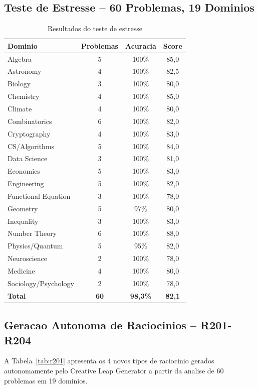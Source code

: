 \documentclass[5p]{elsarticle}
\begin{document}
\subsection{Teste de Estresse -- 60 Problemas, 19 Dominios}

\begin{table}[H]
 \centering
 \caption{Resultados do teste de estresse}
 \label{tab:stress}
 \footnotesize
 \begin{tabular}{lccc}
 \toprule
 \textbf{Dominio} & \textbf{Problemas} & \textbf{Acuracia} & \textbf{Score}\\
 \midrule
 Algebra & 5 & 100\% & 85,0\\
 Astronomy & 4 & 100\% & 82,5\\
 Biology & 3 & 100\% & 80,0\\
 Chemistry & 4 & 100\% & 85,0\\
 Climate & 4 & 100\% & 80,0\\
 Combinatorics & 6 & 100\% & 82,0\\
 Cryptography & 4 & 100\% & 83,0\\
 CS/Algorithms & 5 & 100\% & 84,0\\
 Data Science & 3 & 100\% & 81,0\\
 Economics & 5 & 100\% & 83,0\\
 Engineering & 5 & 100\% & 82,0\\
 Functional Equation & 3 & 100\% & 78,0\\
 Geometry & 5 & 97\% & 80,0\\
 Inequality & 3 & 100\% & 83,0\\
 Number Theory & 6 & 100\% & 88,0\\
 \rowcolor{greenbg} Physics/Quantum & 5 & 95\% & 82,0\\
 Neuroscience & 2 & 100\% & 78,0\\
 Medicine & 4 & 100\% & 80,0\\
 Sociology/Psychology & 2 & 100\% & 78,0\\
 \midrule
 \textbf{Total} & \textbf{60} & \textbf{98,3\%} & \textbf{82,1}\\
 \bottomrule
 \end{tabular}
\end{table}

\subsection{Geracao Autonoma de Raciocinios -- R201-R204}

A Tabela~\ref{tab:r201} apresenta os 4 novos tipos de raciocinio gerados
autonomamente pelo Creative Leap Generator a partir da analise de 60 problemas
em 19 dominios.
\end{document}
